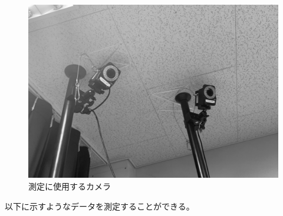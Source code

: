 \documentclass{jsarticle}
\begin{document}
\begin{figure}[h]
\begin{minipage}{0.5\hsize}
                \includegraphics[width=0.9\hsize]{img/camera.jpg}
                \caption{測定に使用するカメラ}
            \end{minipage}
        \end{figure}

        以下に示すようなデータを測定することができる。
\end{document}
